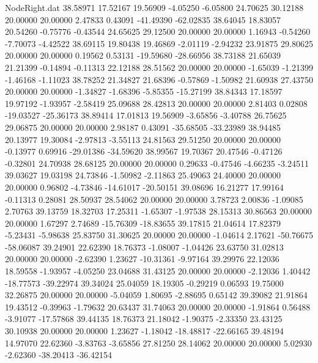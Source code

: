 \begin{filecontents}{NodeRight.dat}
  38.58971   17.52167   19.56909    -4.05250   -6.05800   24.70625   30.12188   20.00000   20.00000    2.47833    0.43091  -41.49390  -62.02835
  38.64045   18.83057   20.54260    -0.75776   -0.43544   24.65625   29.12500   20.00000   20.00000    1.16943   -0.54260   -7.70073   -4.42522
  38.69115   19.80438   19.46869    -2.01119   -2.94232   23.91875   29.80625   20.00000   20.00000    0.19562    0.53131  -19.59680  -28.66956
  38.73188   21.65039   21.21399    -0.14894   -0.11313   22.12188   28.51562   20.00000   20.00000   -1.65039   -1.21399   -1.46168   -1.11023
  38.78252   21.34827   21.68396    -0.57869   -1.50982   21.60938   27.43750   20.00000   20.00000   -1.34827   -1.68396   -5.85355  -15.27199
  38.84343   17.18597   19.97192    -1.93957   -2.58419   25.09688   28.42813   20.00000   20.00000    2.81403    0.02808  -19.03527  -25.36173
  38.89414   17.01813   19.56909    -3.65856   -3.40788   26.75625   29.06875   20.00000   20.00000    2.98187    0.43091  -35.68505  -33.23989
  38.94485   20.13977   19.30084    -2.97813   -3.55113   24.81563   29.51250   20.00000   20.00000   -0.13977    0.69916  -29.01386  -34.59620
  38.99567   19.70367   20.47546    -0.47126   -0.32801   24.70938   28.68125   20.00000   20.00000    0.29633   -0.47546   -4.66235   -3.24511
  39.03627   19.03198   24.73846    -1.50982   -2.11863   25.49063   24.40000   20.00000   20.00000    0.96802   -4.73846  -14.61017  -20.50151
  39.08696   16.21277   17.99164    -0.11313    0.28081   28.50937   28.54062   20.00000   20.00000    3.78723    2.00836   -1.09085    2.70763
  39.13759   18.32703   17.25311    -1.65307   -1.97538   28.15313   30.86563   20.00000   20.00000    1.67297    2.74689  -15.76309  -18.83655
  39.17815   21.04614   17.82379    -5.23431   -5.98638   25.83750   31.30625   20.00000   20.00000   -1.04614    2.17621  -50.76675  -58.06087
  39.24901   22.62390   18.76373    -1.08007   -1.04426   23.63750   31.02813   20.00000   20.00000   -2.62390    1.23627  -10.31361   -9.97164
  39.29976   22.12036   18.59558    -1.93957   -4.05250   23.04688   31.43125   20.00000   20.00000   -2.12036    1.40442  -18.77573  -39.22974
  39.34024   25.04059   18.19305    -0.29219    0.06593   19.75000   32.26875   20.00000   20.00000   -5.04059    1.80695   -2.88695    0.65142
  39.39082   21.91864   19.43512    -0.39963   -1.79632   20.63437   31.74063   20.00000   20.00000   -1.91864    0.56488   -3.91077  -17.57868
  39.44135   18.76373   21.18042    -1.90375   -2.33350   23.43125   30.10938   20.00000   20.00000    1.23627   -1.18042  -18.48817  -22.66165
  39.48194   14.97070   22.62360    -3.83763   -3.65856   27.81250   28.14062   20.00000   20.00000    5.02930   -2.62360  -38.20413  -36.42154

\end{filecontents}

